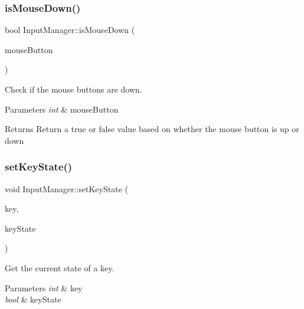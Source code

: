 \subsubsection{\texorpdfstring{is\+Mouse\+Down()}{isMouseDown()}}
{\footnotesize\ttfamily bool Input\+Manager\+::is\+Mouse\+Down (\begin{DoxyParamCaption}\item[{int}]{mouse\+Button }\end{DoxyParamCaption})}



Check if the mouse buttons are down. 


\begin{DoxyParams}{Parameters}
{\em int} & mouse\+Button \\
\hline
\end{DoxyParams}
\begin{DoxyReturn}{Returns}
Return a true or false value based on whether the mouse button is up or down 
\end{DoxyReturn}
\mbox{\label{class_input_manager_a338f09ddb8f3b9bead6435475b1b275e}} 
\subsubsection{\texorpdfstring{set\+Key\+State()}{setKeyState()}}
{\footnotesize\ttfamily void Input\+Manager\+::set\+Key\+State (\begin{DoxyParamCaption}\item[{int}]{key,  }\item[{bool}]{key\+State }\end{DoxyParamCaption})}



Get the current state of a key. 


\begin{DoxyParams}{Parameters}
{\em int} & key \\
\hline
{\em bool} & key\+State \\
\hline
\end{DoxyParams}
\mbox{\label{class_input_manager_acf4ba5834b35bc0c309163b38cd28934}} 
